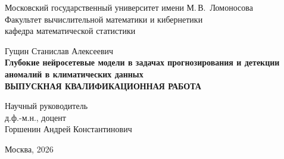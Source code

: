 \documentclass[12pt,a4paper]{extreport}
\newcommand{\thesistitle}{Глубокие нейросетевые модели в задачах прогнозирования и детекции аномалий в климатических данных}
\newcommand{\studentname}{Гущин Станислав Алексеевич}
\newcommand{\advisorname}{Горшенин Андрей Константинович}
\newcommand{\departmentname}{кафедра математической статистики}
\newcommand{\cityyear}{Москва, 2026}
\begin{document}
\begin{titlepage}
\begin{center}
Московский государственный университет имени М.\,В.~Ломоносова\\
Факультет вычислительной математики и кибернетики\\
{\departmentname}
\end{center}

\vspace{24mm}

\begin{center}
{\studentname}\\[8mm]
{\Large\bfseries \thesistitle}\\[10mm]
{\bfseries ВЫПУСКНАЯ КВАЛИФИКАЦИОННАЯ РАБОТА}
\end{center}

\vspace{18mm}

\begin{flushright}
Научный руководитель\\
д.ф.-м.н., доцент\\
{\advisorname}
\end{flushright}

\vfill

\begin{center}
\cityyear
\end{center}
\end{titlepage}

\tableofcontents
\clearpage









\clearpage
\nocite{*}
\printbibliography[heading=bibintoc,title={Список использованных источников}]
\end{document}
